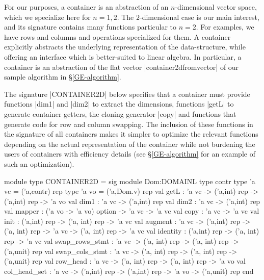 \documentclass{elsart}
\begin{document}
For our purposes, a container is an abstraction of an $n$-dimensional
vector space, which we specialize here for $n=1,2$.  The
$2$-dimensional case is our main interest, and its signature contains
many functions particular to $n=2$.  For examples, we have rows and
columns and operations specialized for them.  A container explicitly
abstracts the underlying representation of the data-structure, while
offering an interface which is better-suited to linear algebra. In
particular, a container is an abstraction of the flat vector
|container2dfromvector| of our sample algorithm in
\S\ref{GE-algorithm}.

The signature |CONTAINER2D| below specifies that a container must
provide functions |dim1| and |dim2| to extract the dimensions,
functions |getL| to generate container getters, the cloning generator
|copy| and functions that generate code for row and column
swapping. The inclusion of these functions in the signature of all
containers makes it simpler to optimize the relevant functions
depending on the actual representation of the container while not
burdening the users of containers with efficiency details (see
\S\ref{GE-algorithm} for an example of such an optimization).
\begin{code}
module type CONTAINER2D = sig
  module Dom:DOMAINL
  type contr
  type 'a vc = ('a,contr) rep
  type 'a vo = ('a,Dom.v) rep
  val getL : 'a vc -> ('a,int) rep -> ('a,int) rep -> 'a vo
  val dim1 : 'a vc -> ('a,int) rep
  val dim2 : 'a vc -> ('a,int) rep
  val mapper : ('a vo -> 'a vo) option -> 'a vc -> 'a vc
  val copy : 'a vc -> 'a vc
  val init : ('a,int) rep -> ('a, int) rep -> 'a vc
  val augment : 'a vc -> ('a,int) rep -> ('a, int) rep -> 'a vc ->
                ('a, int) rep -> 'a vc
  val identity : ('a,int) rep -> ('a, int) rep -> 'a vc
  val swap_rows_stmt : 'a vc -> ('a, int) rep -> ('a, int) rep -> 
                       ('a,unit) rep
  val swap_cols_stmt : 'a vc -> ('a, int) rep -> ('a, int) rep -> 
                       ('a,unit) rep
  val row_head : 'a vc -> ('a, int) rep -> ('a, int) rep -> 'a vo
  val col_head_set : 'a vc -> ('a,int) rep -> ('a,int) rep -> 'a vo -> 
            ('a,unit) rep
end
\end{code}
\end{document}
